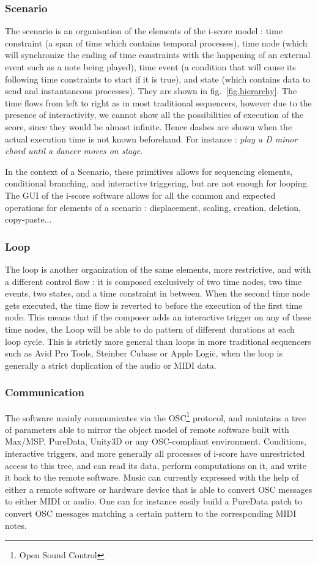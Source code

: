 \documentclass{article}
\begin{document}
\subsubsection{Scenario}
The scenario is an organisation of the elements of the i-score model : time constraint (a span of time which contains temporal processes), time node (which will synchronize the ending of time constraints with the happening of an external event such as a note being played), time event (a condition that will cause its following time constraints to start if it is true), and state (which contains data to send and instantaneous processes).
They are shown in fig.~\ref{fig.hierarchy}. 
The time flows from left to right as in most traditional sequencers, however due to the presence of interactivity, we cannot show all the possibilities of execution of the score, since they would be almost infinite. 
Hence dashes are shown when the actual execution time is not known beforehand. 
For instance : \emph{play a D minor chord until a dancer moves on stage}.

In the context of a Scenario, these primitives allows for sequencing elements, conditional branching, and interactive triggering, but are not enough for looping.
The GUI of the i-score software allows for all the common and expected operations for elements of a scenario : displacement, scaling, creation, deletion, copy-paste...

\subsubsection{Loop}
The loop is another organization of the same elements, more restrictive, and with a different control flow : it is 
composed exclusively of two time nodes, two time events, two states, and a time constraint in between.
When the second time node gets executed, the time flow is reverted to before the execution of the first time node.
This means that if the composer adds an interactive trigger on any of these time nodes, the Loop will be able to do pattern of different durations at each loop cycle.
This is strictly more general than loops in more traditional sequencers such as Avid Pro Tools, Steinber Cubase or Apple Logic, when the loop is generally a strict duplication of the audio or MIDI data.

\subsubsection{Communication}
The software mainly communicates via the OSC\footnote{Open Sound Control} protocol,  and maintains a tree of parameters able to mirror 
the object model of remote software built with Max/MSP, PureData, Unity3D or any OSC-compliant environment. 
Conditions, interactive triggers, and more generally all processes of i-score have unrestricted 
access to this tree, and can read its data, perform computations on it, and write it back to the 
remote software.
Music can currently expressed with the help of either a remote software or hardware device that is able 
to convert OSC messages to either MIDI or audio.
One can for instance easily build a PureData patch to convert OSC messages matching a certain pattern 
to the corresponding MIDI notes.
\end{document}
